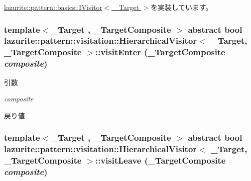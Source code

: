 \hyperlink{interfacelazurite_1_1pattern_1_1basics_1_1_i_visitor_3_01___target_01_4_a9bf1df40e033ad9aec0a33bf6b426eca}{lazurite::pattern::basics::IVisitor$<$ \_\-Target $>$}を実装しています。\hypertarget{classlazurite_1_1pattern_1_1visitation_1_1_hierarchical_visitor_3_01___target_00_01___target_composite_01_4_a211d04d195ed318bfb2d28bea6c6b409}{
\subsubsection[{visitEnter}]{\setlength{\rightskip}{0pt plus 5cm}template$<$\_\-Target , \_\-TargetComposite $>$ abstract bool lazurite::pattern::visitation::HierarchicalVisitor$<$ \_\-Target, \_\-TargetComposite $>$::visitEnter (\_\-TargetComposite {\em composite})}}
\label{classlazurite_1_1pattern_1_1visitation_1_1_hierarchical_visitor_3_01___target_00_01___target_composite_01_4_a211d04d195ed318bfb2d28bea6c6b409}

\begin{DoxyParams}{引数}
\item[{\em composite}]\end{DoxyParams}
\begin{DoxyReturn}{戻り値}

\end{DoxyReturn}
\hypertarget{classlazurite_1_1pattern_1_1visitation_1_1_hierarchical_visitor_3_01___target_00_01___target_composite_01_4_a454772e007240833e80ea44fb2125350}{
\subsubsection[{visitLeave}]{\setlength{\rightskip}{0pt plus 5cm}template$<$\_\-Target , \_\-TargetComposite $>$ abstract bool lazurite::pattern::visitation::HierarchicalVisitor$<$ \_\-Target, \_\-TargetComposite $>$::visitLeave (\_\-TargetComposite {\em composite})}}
\label{classlazurite_1_1pattern_1_1visitation_1_1_hierarchical_visitor_3_01___target_00_01___target_composite_01_4_a454772e007240833e80ea44fb2125350}

